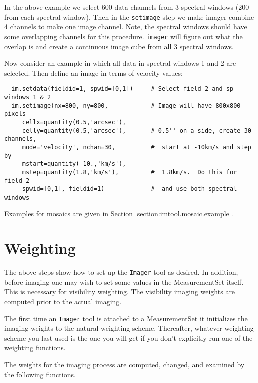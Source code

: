 In the above example we select 600 data channels from 3 spectral
windows (200 from each spectral window). Then in the {\tt setimage}
step we make imager combine 4 channels to make one image channel.
Note, the spectral windows should have some overlapping channels for
this procedure.  {\tt imager} will figure out what the overlap is and
create a continuous image cube from all 3 spectral windows.

Now consider an example in which all data in spectral windows 1 and 2
are selected.  Then define an image in terms of velocity values:

\small
\begin{verbatim}
  im.setdata(fieldid=1, spwid=[0,1])     # Select field 2 and sp windows 1 & 2
  im.setimage(nx=800, ny=800,            # Image will have 800x800 pixels
     cellx=quantity(0.5,'arcsec'),
     celly=quantity(0.5,'arcsec'),       # 0.5'' on a side, create 30 channels,
     mode='velocity', nchan=30,          #  start at -10km/s and step by
     mstart=quantity(-10.,'km/s'),
     mstep=quantity(1.8,'km/s'),         #  1.8km/s.  Do this for field 2
     spwid=[0,1], fieldid=1)             #  and use both spectral windows
\end{verbatim}
\normalsize

Examples for mosaics are given in Section
\ref{section:imtool.mosaic.example}. 

\section{Weighting}
\label{section:imtool.weight}

The above steps show how to set up the {\tt Imager} tool as desired.  In
addition, before imaging one may wish to set some values in the
MeasurementSet itself.  This is necessary for visibility weighting.  The
visibility imaging weights are computed prior to the actual imaging.

The first time an {\tt Imager} tool is attached to a MeasurementSet it
initializes the imaging weights to the natural weighting scheme.
Thereafter, whatever weighting scheme you last used is the one you
will get if you don't explicitly run one of the weighting functions.

The weights for the imaging process are computed, changed, and examined by
the following functions.

